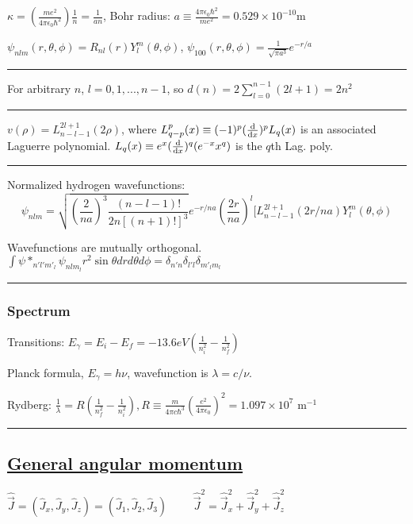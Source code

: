 $\kappa = (\frac{me^2}{4 \pi \epsilon_0 \hbar^2}) \frac{1}{n} = \frac{1}{an}$, Bohr radius: $a \equiv \frac{4 \pi \epsilon_0 \hbar^2}{me^2} = 0.529 \times 10^{-10} \textrm{m}$

$\psi_{nlm}(r, \theta, \phi) = R_{nl}(r) Y_l^m(\theta, \phi)$, 
$\psi_{100}(r, \theta, \phi) = \frac{1}{\sqrt{\pi a^3}} e^{-r/a}$

\hrule height 0.1pt

For arbitrary $n$, $l = 0, 1, ..., n-1$, so $d(n) = 2 \sum_{l=0}^{n-1} (2l+1) = 2 n^2$

\hrule height 0.07pt

$v(\rho) = L_{n-l-1}^{2l+1} (2 \rho)$, where $L_{q-p}^p(x) \equiv (-1)^p (\dv{}{x})^p L_q (x)$ is an associated Laguerre polynomial. $L_q(x) \equiv e^x (\dv{}{x})^q (e^{-x} x^q)$ is the $q$th Lag. poly.

\hrule height 0.07pt

Normalized hydrogen wavefunctions:
$$\psi_{nlm} = \sqrt{(\frac{2}{na})^3 \frac{(n-l-1)!}{2n[(n+1)!]^3}} e^{-r/na} (\frac{2r}{na})^l [L_{n-l-1}^{2l+1} (2r/na) Y_l^m (\theta, \phi)$$

Wavefunctions are mutually orthogonal.
$\int \psi*_{n'l'm'_l} \psi_{nlm_l} r^2 \sin \theta dr d\theta d \phi = \delta_{n'n} \delta_{l'l} \delta_{m'_l m_l}$

\hrule height 0.1pt

\subsubsection{Spectrum}

Transitions: $E_{\gamma} = E_i - E_f = -13.6 eV(\frac{1}{n_i^2} - \frac{1}{n_f^2})$

\vspace{-2pt}

Planck formula, $E_{\gamma} = h \nu$, wavefunction is $\lambda = c / \nu$. 

Rydberg: $\frac{1}{\lambda} = R(\frac{1}{n^2_f} - \frac{1}{n^2_i}), R \equiv \frac{m}{4 \pi c \hbar^3} (\frac{e^2}{4 \pi \epsilon_0})^2 = 1.097 \times 10^7 \textrm{ m}^{-1}$

\hrule height 0.1pt

\subsection{\underline{General angular momentum}}
$\widehat{\vec{J}} = (\widehat{J}_x, \widehat{J}_y, \widehat{J}_z) = (\widehat{J}_1, \widehat{J}_2, \widehat{J}_3) \qquad$ 
$\widehat{\vec{J}}^2 = \widehat{\vec{J}}^2_x + \widehat{\vec{J}}^2_y + \widehat{\vec{J}}^2_z$

